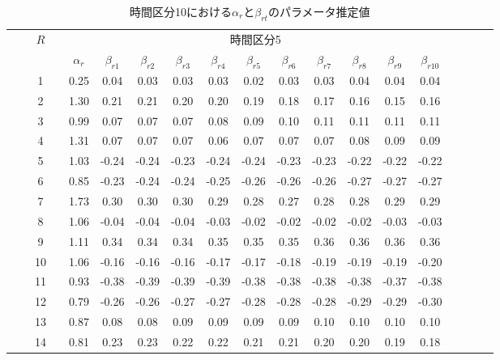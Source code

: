 \documentclass[a4paper，11pt，oneside，openany]{jsbook}
\newcommand{\bhline}[1]{\noalign{\hrule height #1}}
\begin{document}
\begin{table}[h!]
\begin{center}
\caption{時間区分10における$\alpha_r$と$\beta_{rt}の$パラメータ推定値}
\setlength{\tabcolsep}{5.pt}
\begin{tabular}{ccccccccccccccccccc}  
\bhline{1pt}
& & \multirow{2}{*}{$R$} & & \multicolumn{11}{c}{時間区分5}     \\
\cline{5-15}
  & &  & & $\alpha_r$ & $\beta_{r1}$ & $\beta_{r2}$ & $\beta_{r3}$ & $\beta_{r4}$ & $\beta_{r5}$ & $\beta_{r6}$ & $\beta_{r7}$ & $\beta_{r8}$ & $\beta_{r9}$ & $\beta_{r10}$ \\
\bhline{1pt}
 &  & 1  &  & 0.25 & 0.04  & 0.03  & 0.03  & 0.03  & 0.02  & 0.03  & 0.03  & 0.04  & 0.04  & 0.04  \\
 &  & 2  &  & 1.30 & 0.21  & 0.21  & 0.20  & 0.20  & 0.19  & 0.18  & 0.17  & 0.16  & 0.15  & 0.16  \\
 &  & 3  &  & 0.99 & 0.07  & 0.07  & 0.07  & 0.08  & 0.09  & 0.10  & 0.11  & 0.11  & 0.11  & 0.11  \\
 &  & 4  &  & 1.31 & 0.07  & 0.07  & 0.07  & 0.06  & 0.07  & 0.07  & 0.07  & 0.08  & 0.09  & 0.09  \\
 &  & 5  &  & 1.03 & -0.24 & -0.24 & -0.23 & -0.24 & -0.24 & -0.23 & -0.23 & -0.22 & -0.22 & -0.22 \\
 &  & 6  &  & 0.85 & -0.23 & -0.24 & -0.24 & -0.25 & -0.26 & -0.26 & -0.26 & -0.27 & -0.27 & -0.27 \\
 &  & 7  &  & 1.73 & 0.30  & 0.30  & 0.30  & 0.29  & 0.28  & 0.27  & 0.28  & 0.28  & 0.29  & 0.29  \\
 &  & 8  &  & 1.06 & -0.04 & -0.04 & -0.04 & -0.03 & -0.02 & -0.02 & -0.02 & -0.02 & -0.03 & -0.03 \\
 &  & 9  &  & 1.11 & 0.34  & 0.34  & 0.34  & 0.35  & 0.35  & 0.35  & 0.36  & 0.36  & 0.36  & 0.36  \\
 &  & 10 &  & 1.06 & -0.16 & -0.16 & -0.16 & -0.17 & -0.17 & -0.18 & -0.19 & -0.19 & -0.19 & -0.20 \\
 &  & 11 &  & 0.93 & -0.38 & -0.39 & -0.39 & -0.39 & -0.38 & -0.38 & -0.38 & -0.38 & -0.37 & -0.38 \\
 &  & 12 &  & 0.79 & -0.26 & -0.26 & -0.27 & -0.27 & -0.28 & -0.28 & -0.28 & -0.29 & -0.29 & -0.30 \\
 &  & 13 &  & 0.87 & 0.08  & 0.08  & 0.09  & 0.09  & 0.09  & 0.09  & 0.10  & 0.10  & 0.10  & 0.10  \\
 &  & 14 &  & 0.81 & 0.23  & 0.23  & 0.22  & 0.22  & 0.21  & 0.21  & 0.20  & 0.20  & 0.19  & 0.18  \\

\end{tabular}
\end{center}
\end{table}
\end{document}
